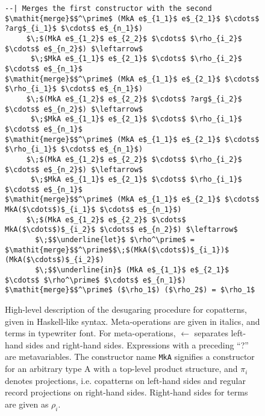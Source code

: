 \begin{figure}
\begin{lstlisting}[mathescape]
--| Merges the first constructor with the second
$\mathit{merge}$$^\prime$ (MkA e$_{1_1}$ e$_{2_1}$ $\cdots$ ?arg$_{i_1}$ $\cdots$ e$_{n_1}$)
     $\;$(MkA e$_{1_2}$ e$_{2_2}$ $\cdots$ $\rho_{i_2}$  $\cdots$ e$_{n_2}$) $\leftarrow$ 
      $\;$MkA e$_{1_1}$ e$_{2_1}$ $\cdots$ $\rho_{i_2}$ $\cdots$ e$_{n_1}$
$\mathit{merge}$$^\prime$ (MkA e$_{1_1}$ e$_{2_1}$ $\cdots$ $\rho_{i_1}$ $\cdots$ e$_{n_1}$)
     $\;$(MkA e$_{1_2}$ e$_{2_2}$ $\cdots$ ?arg$_{i_2}$  $\cdots$ e$_{n_2}$) $\leftarrow$
      $\;$MkA e$_{1_1}$ e$_{2_1}$ $\cdots$ $\rho_{i_1}$ $\cdots$ e$_{n_1}$
$\mathit{merge}$$^\prime$ (MkA e$_{1_1}$ e$_{2_1}$ $\cdots$ $\rho_{i_1}$ $\cdots$ e$_{n_1}$)
     $\;$(MkA e$_{1_2}$ e$_{2_2}$ $\cdots$ $\rho_{i_2}$  $\cdots$ e$_{n_2}$) $\leftarrow$
      $\;$MkA e$_{1_1}$ e$_{2_1}$ $\cdots$ $\rho_{i_1}$ $\cdots$ e$_{n_1}$
$\mathit{merge}$$^\prime$ (MkA e$_{1_1}$ e$_{2_1}$ $\cdots$ MkA($\cdots$)$_{i_1}$ $\cdots$ e$_{n_1}$)
     $\;$(MkA e$_{1_2}$ e$_{2_2}$ $\cdots$ MkA($\cdots$)$_{i_2}$ $\cdots$ e$_{n_2}$) $\leftarrow$ 
       $\;$$\underline{let}$ $\rho^\prime$ = $\mathit{merge}$$^\prime$$\;$(MkA($\cdots$)$_{i_1})$  (MkA($\cdots$)$_{i_2}$)
       $\;$$\underline{in}$ (MkA e$_{1_1}$ e$_{2_1}$ $\cdots$ $\rho^\prime$ $\cdots$ e$_{n_1}$)
$\mathit{merge}$$^\prime$ ($\rho_1$) ($\rho_2$) = $\rho_1$
\end{lstlisting}
\caption{High-level description of the desugaring procedure for copatterns,
  given in Haskell-like syntax. Meta-operations are given in italics, and
  \IdrisM{} terms in typewriter font. For meta-operations, $\leftarrow$ separates
  left-hand sides and right-hand sides. Expressions with a preceding ``?'' are
  \IdrisM{} metavariables. The constructor name \texttt{MkA} signifies a
  constructor for an arbitrary type A with a top-level product structure, and $\pi_i$ denotes projections,
  i.e. copatterns on left-hand sides and regular record projections on
  right-hand sides. Right-hand sides for \IdrisM{} terms are given as $\rho_i$.}
\label{fig:desugaring_formalization}
\end{figure}


